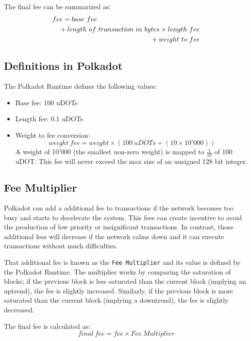 \documentclass[11pt,a4paper]{article}
\begin{document}
The final fee can be summarized as:
\begin{eqnarray*}
\lefteqn{fee = base\ fee}\\
      &&{} + length\ of\ transaction\ in\ bytes \times length\ fee\\
      &&{} + weight\ to\ fee\\
\end{eqnarray*}

\subsection{Definitions in Polkadot}
The Polkadot Runtime defines the following values:
\begin{itemize}
\item Base fee: 100 uDOTs
\item Length fee: 0.1 uDOTs
\item Weight to fee conversion:
      $$
            weight\ fee = weight \times (100\ uDOTs \div (10 \times 10'000))
      $$
      A weight of 10'000 (the smallest non-zero weight) is mapped to $\frac{1}{10}$ of 100 uDOT.
      \newline
      This fee will never exceed the max size of an unsigned 128 bit integer.
\end{itemize}

\subsection{Fee Multiplier}
Polkadot can add a additional fee to transactions if the network becomes too busy and starts to
decelerate the system. This fees can create incentive to avoid the production of
low priority or insignificant transactions. In contrast, those additional fees will decrease if
the network calms down and it can execute transactions without much difficulties.
\newline

That additional fee is known as the \verb|Fee Multiplier| and its value is defined
by the Polkadot Runtime. The multiplier works by comparing the saturation of blocks; if the previous 
block is less saturated than the current block (implying an uptrend), the fee is slightly increased.
Similarly, if the previous block is more saturated than the current block (implying a downtrend), the
fee is slightly decreased.
\newline

The final fee is calculated as:
$$
      final\ fee = fee \times Fee\ Multiplier
$$
\end{document}
